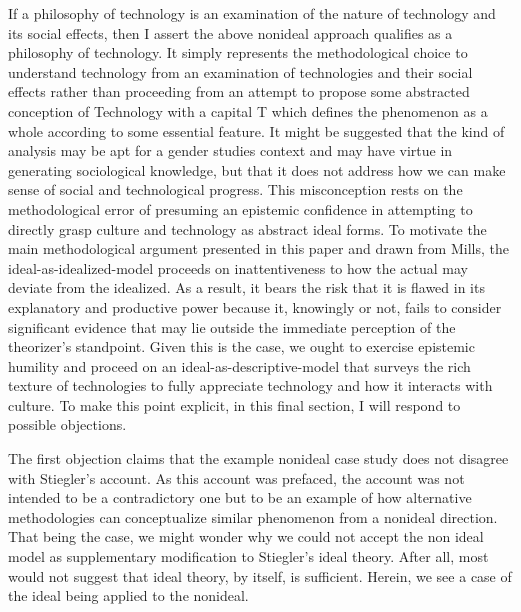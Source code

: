 \documentclass[letterpaper,notitlepage,12pt]{article}
\begin{document}
If a philosophy of technology is an examination of the nature of technology and
its social effects, then I assert the above nonideal approach qualifies as a
philosophy of technology.
It simply represents the methodological choice to understand technology from an
examination of technologies and their social effects rather than proceeding from
an attempt to propose some abstracted conception of Technology with a capital T
which defines the phenomenon as a whole according to some essential feature.
It might be suggested that the kind of analysis may be apt for a gender studies
context and may have virtue in generating sociological knowledge, but that it
does not address how we can make sense of social and technological progress.
This misconception rests on the methodological error of presuming an epistemic
confidence in attempting to directly grasp culture and technology as abstract
ideal forms.
To motivate the main methodological argument presented in this paper and drawn
from Mills, the ideal-as-idealized-model proceeds on inattentiveness to how the
actual may deviate from the idealized.
As a result, it bears the risk that it is flawed in its explanatory and
productive power because it, knowingly or not, fails to consider significant
evidence that may lie outside the immediate perception of the theorizer's
standpoint.
Given this is the case, we ought to exercise epistemic humility and proceed on
an ideal-as-descriptive-model that surveys the rich texture of technologies to
fully appreciate technology and how it interacts with culture.
To make this point explicit, in this final section, I will respond to possible
objections.

The first objection claims that the example nonideal case study does not
disagree with Stiegler's account.
As this account was prefaced, the account was not intended to be a
contradictory one but to be an example of how alternative methodologies can
conceptualize similar phenomenon from a nonideal direction.
That being the case, we might wonder why we could not accept the non ideal model
as supplementary modification to Stiegler's ideal theory.
After all, most would not suggest that ideal theory, by itself, is sufficient.
Herein, we see a case of the ideal being applied to the nonideal.
\end{document}
